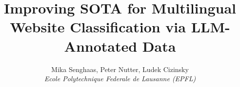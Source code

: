 \documentclass[10pt,conference,compsocconf]{IEEEtran}
\begin{document}
\title{
  Improving SOTA for Multilingual Website Classification via LLM-Annotated Data
}

\author{
  Mika Senghaas, Peter Nutter, Ludek Cizinsky\\
  \textit{Ecole Polytechnique Federale de Lausanne (EPFL)}\\
}
\maketitle











\newpage




\appendix


\end{document}
